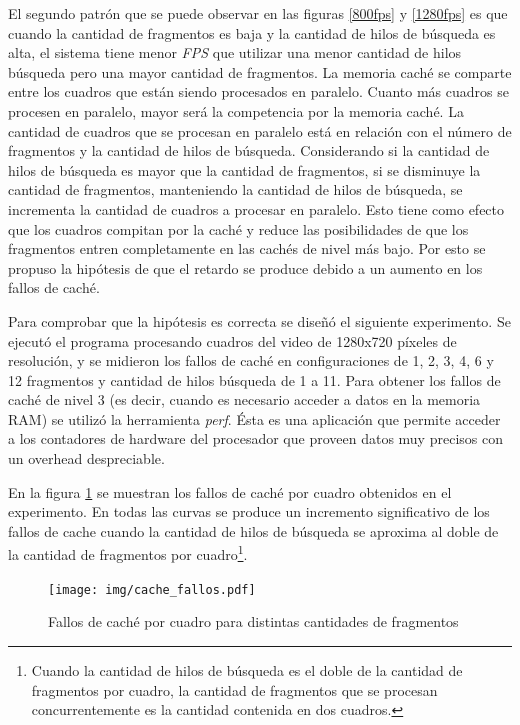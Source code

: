 El segundo patrón que se puede observar en las figuras \ref{800fps} y
\ref{1280fps} es que cuando la cantidad de fragmentos es baja y la cantidad de
hilos de búsqueda es alta, el sistema tiene menor \emph{FPS} que utilizar una
menor cantidad de hilos búsqueda pero una mayor cantidad de fragmentos. La
memoria caché se comparte entre los cuadros que están siendo procesados en
paralelo. Cuanto más cuadros se procesen en paralelo, mayor será la competencia
por la memoria caché. La cantidad de cuadros que se procesan en paralelo está en
relación con el número de fragmentos y la cantidad de hilos de búsqueda.
Considerando si la cantidad de hilos de búsqueda es mayor que la cantidad de
fragmentos, si se disminuye la cantidad de fragmentos, manteniendo la cantidad
de hilos de búsqueda, se incrementa la cantidad de cuadros a procesar en
paralelo. Esto tiene como efecto que los cuadros compitan por la caché y reduce
las posibilidades de que los fragmentos entren completamente en las cachés de
nivel más bajo. Por esto se propuso la hipótesis de que el retardo se produce
debido a un aumento en los fallos de caché.

Para comprobar que la hipótesis es correcta se diseñó el siguiente experimento.
Se ejecutó el programa procesando cuadros del video de 1280x720 píxeles de
resolución, y se midieron los fallos de caché en configuraciones de 1, 2, 3, 4,
6 y 12 fragmentos y cantidad de hilos búsqueda de 1 a 11. Para obtener los
fallos de caché de nivel 3 (es decir, cuando es necesario acceder a datos en la
memoria RAM) se utilizó la herramienta \emph{perf}. Ésta es una aplicación que
permite acceder a los contadores de hardware del procesador que proveen datos
muy precisos con un overhead despreciable.

En la figura \ref{cacheFallos} se muestran los fallos de caché por cuadro
obtenidos en el experimento. En todas las curvas se produce un incremento
significativo de los fallos de cache cuando la cantidad de hilos de búsqueda se
aproxima al doble de la cantidad de fragmentos por cuadro\footnote{Cuando la
cantidad de hilos de búsqueda es el doble de la cantidad de fragmentos por
cuadro, la cantidad de fragmentos que se procesan concurrentemente es la
cantidad contenida en dos cuadros.}.

\begin{figure}[h]

	\texttt{[image: img/cache\_fallos.pdf]}
	\caption{Fallos de caché por cuadro para distintas cantidades de
	fragmentos}
	\label{cacheFallos}

\end{figure}

